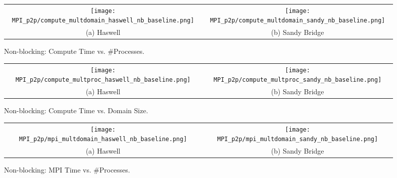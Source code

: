 \begin{enumerate}
	\begin{figure}[p] %
		\begin{tabular}{cc}
			\hspace*{-0.35\linewidth}\texttt{[image: MPI\_p2p/compute\_multdomain\_haswell\_nb\_baseline.png]} & \hspace*{-0.05\linewidth}\texttt{[image: MPI\_p2p/compute\_multdomain\_sandy\_nb\_baseline.png]} \\
			\hspace*{-0.45\linewidth}(a) Haswell & \hspace*{-0.15\linewidth}(b) Sandy Bridge\\[6pt]
		\end{tabular}
		\caption{Non-blocking: Compute Time vs. \#Processes.}
		\label{fig:compute_multdomain_nb_baseline}
	\end{figure}
	
	\begin{figure}[p] %
		\begin{tabular}{cc}
			\hspace*{-0.35\linewidth}\texttt{[image: MPI\_p2p/compute\_multproc\_haswell\_nb\_baseline.png]} & \hspace*{-0.05\linewidth}\texttt{[image: MPI\_p2p/compute\_multproc\_sandy\_nb\_baseline.png]} \\
			\hspace*{-0.45\linewidth}(a) Haswell & \hspace*{-0.15\linewidth}(b) Sandy Bridge\\[6pt]
		\end{tabular}
		\caption{Non-blocking: Compute Time vs. Domain Size.}
		\label{fig:compute_multproc_nb_baseline}
	\end{figure}
	
	\begin{figure}[p] %
		\begin{tabular}{cc}
			\hspace*{-0.35\linewidth}\texttt{[image: MPI\_p2p/mpi\_multdomain\_haswell\_nb\_baseline.png]} & \hspace*{-0.05\linewidth}\texttt{[image: MPI\_p2p/mpi\_multdomain\_sandy\_nb\_baseline.png]} \\
			\hspace*{-0.45\linewidth}(a) Haswell & \hspace*{-0.15\linewidth}(b) Sandy Bridge\\[6pt]
		\end{tabular}
		\caption{Non-blocking: MPI Time vs. \#Processes.}
		\label{fig:mpi_multdomain_nb_baseline}
	\end{figure}
	

\end{enumerate}
